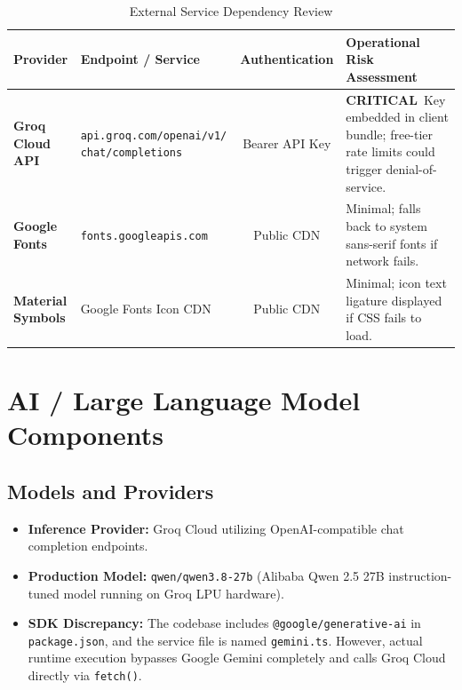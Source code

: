 \documentclass[10pt,a4paper]{report}
\newcommand{\badgeCrit}{\colorbox{red!20}{\textcolor{critRed}{\bfseries\scriptsize CRITICAL}}}
\begin{document}
\begin{table}[htbp]
\centering
\small
\caption{External Service Dependency Review}
\begin{tabularx}{\textwidth}{l p{4cm} c X}
\toprule
\textbf{Provider} & \textbf{Endpoint / Service} & \textbf{Authentication} & \textbf{Operational Risk Assessment} \\
\midrule
\textbf{Groq Cloud API} & \texttt{api.groq.com/openai/v1/ chat/completions} & Bearer API Key & \badgeCrit\ Key embedded in client bundle; free-tier rate limits could trigger denial-of-service. \\
\addlinespace
\textbf{Google Fonts} & \texttt{fonts.googleapis.com} & Public CDN & Minimal; falls back to system sans-serif fonts if network fails. \\
\addlinespace
\textbf{Material Symbols} & Google Fonts Icon CDN & Public CDN & Minimal; icon text ligature displayed if CSS fails to load. \\
\bottomrule
\end{tabularx}
\end{table}

\chapter{AI / Large Language Model Components}

\section{Models and Providers}
\begin{itemize}[leftmargin=1.5em]
    \item \textbf{Inference Provider:} Groq Cloud utilizing OpenAI-compatible chat completion endpoints.
    \item \textbf{Production Model:} \texttt{qwen/qwen3.8-27b} (Alibaba Qwen 2.5 27B instruction-tuned model running on Groq LPU hardware).
    \item \textbf{SDK Discrepancy:} The codebase includes \texttt{@google/generative-ai} in \texttt{package.json}, and the service file is named \texttt{gemini.ts}. However, actual runtime execution bypasses Google Gemini completely and calls Groq Cloud directly via \texttt{fetch()}.
\end{itemize}
\end{document}
